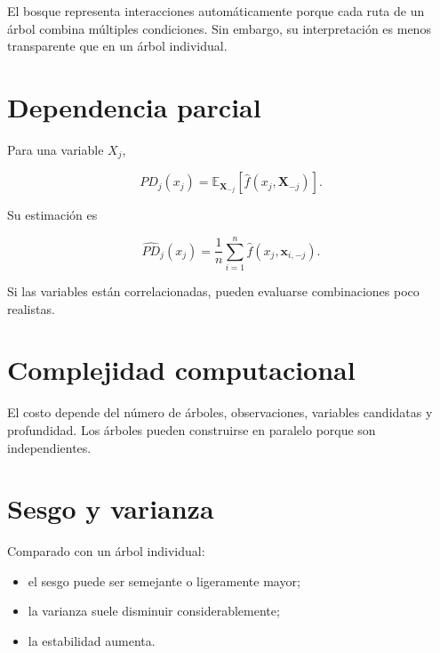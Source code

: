 \documentclass[
  spanish,
  10.5pt,
  letterpaper,
  DIV=11,
  numbers=noendperiod,
  oneside,
  open=any]{scrreprt}
\providecommand{\tightlist}{%
  \setlength{\itemsep}{0pt}\setlength{\parskip}{0pt}}
\theoremstyle{definition}
\theoremstyle{definition}
\theoremstyle{plain}
\theoremstyle{remark}
\begin{document}

El bosque representa interacciones automáticamente porque cada ruta de
un árbol combina múltiples condiciones. Sin embargo, su interpretación
es menos transparente que en un árbol individual.

\section*{Dependencia parcial}\label{dependencia-parcial}


Para una variable \(X_j\),

\[
PD_j(x_j)
=
\mathbb{E}_{\mathbf{X}_{-j}}
\left[
\widehat{f}(x_j,\mathbf{X}_{-j})
\right].
\]

Su estimación es

\[
\widehat{PD}_j(x_j)
=
\frac{1}{n}
\sum_{i=1}^{n}
\widehat{f}(x_j,\mathbf{x}_{i,-j}).
\]

Si las variables están correlacionadas, pueden evaluarse combinaciones
poco realistas.

\section*{Complejidad computacional}\label{complejidad-computacional-1}


El costo depende del número de árboles, observaciones, variables
candidatas y profundidad. Los árboles pueden construirse en paralelo
porque son independientes.

\section*{Sesgo y varianza}\label{sesgo-y-varianza-3}


Comparado con un árbol individual:

\begin{itemize}
\tightlist
\item
  el sesgo puede ser semejante o ligeramente mayor;
\item
  la varianza suele disminuir considerablemente;
\item
  la estabilidad aumenta.
\end{itemize}
\end{document}
